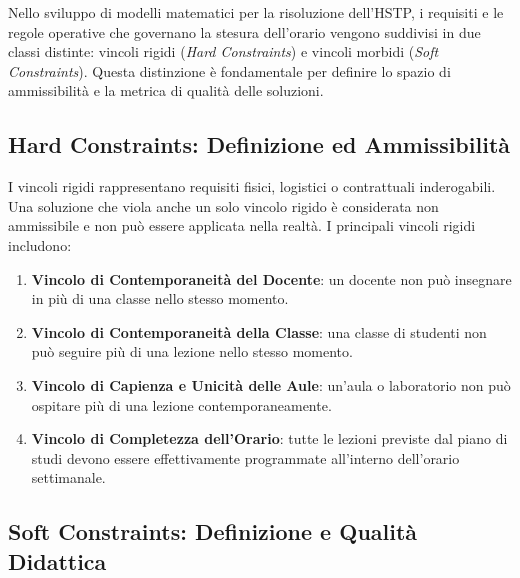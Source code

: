 Nello sviluppo di modelli matematici per la risoluzione dell'HSTP, i requisiti e
le regole operative che governano la stesura dell'orario vengono suddivisi in
due classi distinte: vincoli rigidi (\textit{Hard Constraints}) e vincoli
morbidi (\textit{Soft Constraints}). Questa distinzione è fondamentale per
definire lo spazio di ammissibilità e la metrica di qualità delle soluzioni.

\subsection*{Hard Constraints: Definizione ed Ammissibilità}
\label{subsec:hard-def}

I vincoli rigidi rappresentano requisiti fisici, logistici o contrattuali
inderogabili. Una soluzione che viola anche un solo vincolo rigido è considerata
non ammissibile e non può essere applicata nella realtà. I principali vincoli
rigidi includono:
\begin{enumerate}
    \item \textbf{Vincolo di Contemporaneità del Docente}: un docente non può
    insegnare in più di una classe nello stesso momento.
    \item \textbf{Vincolo di Contemporaneità della Classe}: una classe di
    studenti non può seguire più di una lezione nello stesso momento.
    \item \textbf{Vincolo di Capienza e Unicità delle Aule}: un'aula o
    laboratorio non può ospitare più di una lezione contemporaneamente.
    \item \textbf{Vincolo di Completezza dell'Orario}: tutte le lezioni previste
    dal piano di studi devono essere effettivamente programmate all'interno
    dell'orario settimanale.
\end{enumerate}

\subsection*{Soft Constraints: Definizione e Qualità Didattica}
\label{subsec:soft-def}

